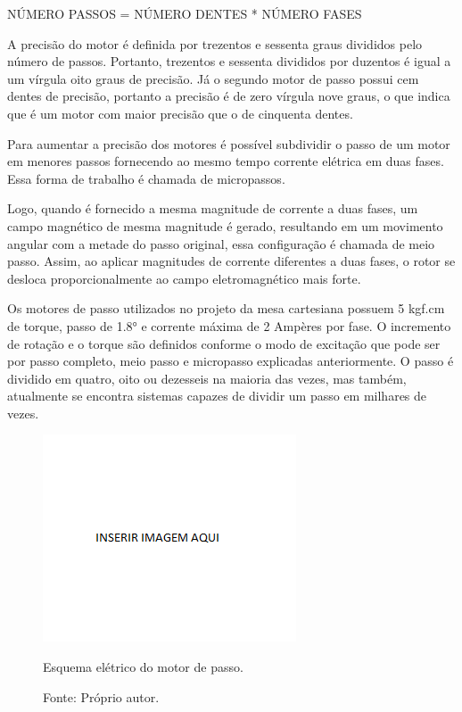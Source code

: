 NÚMERO PASSOS = NÚMERO DENTES * NÚMERO FASES

A precisão do motor é definida por trezentos e sessenta graus divididos pelo número de passos. Portanto, 
trezentos e sessenta divididos por duzentos é igual a um vírgula oito graus de precisão. Já o segundo motor 
de passo possui cem dentes de precisão, portanto a precisão é de zero vírgula nove graus, o que indica que 
é um motor com maior precisão que o de cinquenta dentes.

Para aumentar a precisão dos motores é possível subdividir o passo de um motor em menores passos fornecendo 
ao mesmo tempo corrente elétrica em duas fases. Essa forma de trabalho é chamada de micropassos.

Logo, quando é fornecido a mesma magnitude de corrente a duas fases, um campo magnético de mesma magnitude 
é gerado, resultando em um movimento angular com a metade do passo original, essa configuração é chamada de 
meio passo. Assim, ao aplicar magnitudes de corrente diferentes a duas fases, o rotor se desloca 
proporcionalmente ao campo eletromagnético mais forte.

Os motores de passo utilizados no projeto da mesa cartesiana possuem 5 kgf.cm de torque, passo de 1.8° e 
corrente máxima de 2 Ampères por fase. O incremento de rotação e o torque são definidos conforme o modo 
de excitação que pode ser por passo completo, meio passo e micropasso explicadas anteriormente. O passo 
é dividido em quatro, oito ou dezesseis na maioria das vezes, mas também, atualmente se encontra 
sistemas capazes de  dividir um passo em milhares de vezes.

\begin{figure}[!htb]
\centering
\includegraphics[scale = 0.2]{figuras/3-16}
\caption{Esquema elétrico do motor de passo.}
\caption*{Fonte: Próprio autor.}
\label{figesquemaeletrico}
\end{figure}
    
